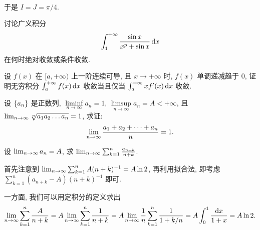 \begin{exercise}[series=exer]
\begin{answer}
\begin{align*}
      \end{align*}
      于是 $ I = J = \pi/4 $.
  \end{answer}
  \item 讨论广义积分
  \begin{align*}
      \int_{1}^{+\infty} \frac{\sin x}{x^{p} + \sin x} \dx*
  \end{align*}
  在何时绝对收敛或条件收敛.
  \item 设 $ f(x) $ 在 $ [a, +\infty) $ 上一阶连续可导, 且 $ x \to +\infty $ 时, $ f(x) $ 单调递减趋于 $ 0 $, 证明无穷积分 $ \int_{a}^{+\infty} f(x) \dx* $ 收敛当且仅当 $ \int_{a}^{+\infty} xf'(x) \dx* $ 收敛.
  \item 设 $ \qty{a_{n}} $ 是正数列, $ \liminf\limits_{n\to\infty} a_{n} = 1 $, $ \limsup\limits_{n\to\infty} a_{n} = A < +\infty $, 且 $ \lim_{n \to \infty} \sqrt[n]{a_{1}a_{2}\dots a_{n}} = 1 $, 求证:
  \begin{align*}
      \lim_{n \to \infty}\frac{a_{1} + a_{2} + \dots + a_{n}}{n} = 1.
  \end{align*}
  \item 设 $ \lim_{n \to \infty} a_{n} = A $, 求 $ \lim_{n \to \infty} \sum_{k=1}^{n} \frac{a_{n+k}}{n+k} $.
  \begin{hint}
      首先注意到 $ \lim_{n \to \infty}\sum_{k = 1}^{n} A(n + k)^{-1} = A\ln 2 $, 再利用拟合法, 即考虑 $ \sum_{k = 1}^{n} (a_{n + k} - A)(n + k)^{-1} $ 即可.
  \end{hint}
  \begin{answer}
      一方面, 我们可以用定积分的定义求出
      \begin{align*}
          \limit{n}{\infty}\sum_{k = 1}^{n}\frac{A}{n + k} = A \limit{n}{\infty}\sum_{k = 1}^{n} \frac{1}{n + k} = A \limit{n}{\infty}\frac{1}{n} \sum_{k = 1}^{n}\frac{1}{1 + k/n} = A\int_{0}^{1} \frac{\dx}{1 + x} = A\ln 2.
      \end{align*}


\end{answer}
\end{exercise}
